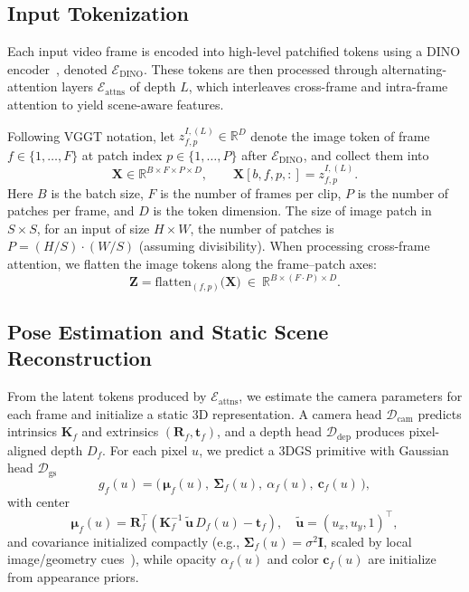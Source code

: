 \subsection{Input Tokenization}\label{sec:tokens}
Each input video frame is encoded into high-level patchified tokens using a DINO encoder~\cite{dino2}, denoted $\mathcal{E}_{\text{DINO}}$. 
These tokens are then processed through alternating-attention layers $\mathcal{E}_{\text{attns}}$ of depth $L$, which interleaves cross-frame and intra-frame attention to yield scene-aware features. 

Following VGGT notation, let $z^{I,(L)}_{f,p}\in\mathbb{R}^{D}$ denote the image token of frame $f\in\{1,\dots,F\}$ at patch index $p\in\{1,\dots,P\}$ after $\mathcal{E}_{\text{DINO}}$, and collect them into
\[
\mathbf{X}\in\mathbb{R}^{B\times F\times P\times D},\qquad
\mathbf{X}[b,f,p,:]=z^{I,(L)}_{f,p}.
\]
Here $B$ is the batch size, $F$ is the number of frames per clip, $P$ is the number of patches per frame, and $D$ is the token dimension.
The size of image patch in $S \times S$, for an input of size $H\times W$, the number of patches is $P=(H/S)\cdot(W/S)$ (assuming divisibility). 
When processing cross-frame attention, we flatten the image tokens along the frame–patch axes:
\[
\mathbf{Z}=\mathrm{flatten}_{(f,p)}\big(\mathbf{X}\big)\ \in\ \mathbb{R}^{B\times(F\!\cdot\!P)\times D}.
\]
\subsection{Pose Estimation and Static Scene Reconstruction}\label{sec:static}
From the latent tokens produced by $\mathcal{E}_{\text{attns}}$, we estimate the camera parameters for each frame and initialize a static 3D representation. 
A camera head $\mathcal{D}_{\text{cam}}$ predicts intrinsics $\mathbf{K}_f$ and extrinsics $(\mathbf{R}_f,\mathbf{t}_f)$, and a depth head $\mathcal{D}_{\text{dep}}$ produces pixel-aligned depth $D_f$. For each pixel $u$, we predict a 3DGS primitive with Gaussian head $\mathcal{D}_{\text{gs}}$
\[
g_f(u)=\big(\,\mathbf{\mu}_f(u),\ \mathbf{\Sigma}_f(u),\ \alpha_f(u),\ \mathbf{c}_f(u)\,\big),
\]
with center
\[
\mathbf{\mu}_f(u)=\mathbf{R}_f^{\!\top}\!\left(\mathbf{K}_f^{-1}\,\tilde{\mathbf{u}}\,D_f(u)-\mathbf{t}_f\right),\quad \tilde{\mathbf{u}}=(u_x,u_y,1)^\top,
\]
and covariance initialized compactly (e.g., $\mathbf{\Sigma}_f(u)=\sigma^2\mathbf{I}$, scaled by local image/geometry cues~\cite{meuleman2025onthefly}), while opacity $\alpha_f(u)$ and color $\mathbf{c}_f(u)$ are initialize from appearance priors.

